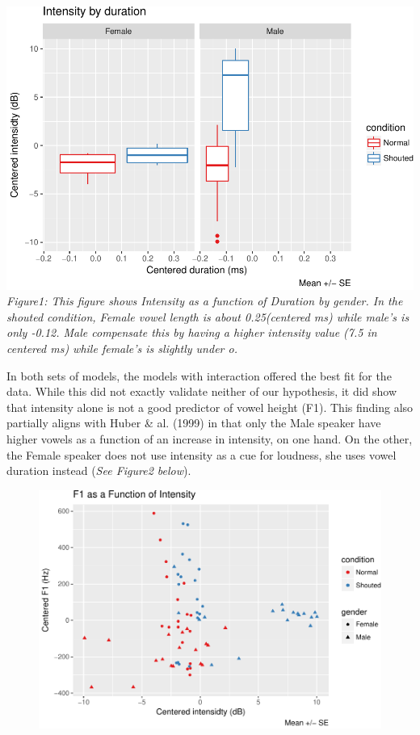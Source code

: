 \documentclass[floatsintext,man]{apa6}
\theoremstyle{definition}
\theoremstyle{definition}
\theoremstyle{definition}
\theoremstyle{remark}
\begin{document}
\includegraphics{shouted_files/figure-latex/Figure1-1.pdf}
\emph{Figure1: This figure shows Intensity as a function of Duration by
gender. In the shouted condition, Female vowel length is about
0.25(centered ms) while male's is only -0.12. Male compensate this by
having a higher intensity value (7.5 in centered ms) while female's is
slightly under o.}

In both sets of models, the models with interaction offered the best fit
for the data. While this did not exactly validate neither of our
hypothesis, it did show that intensity alone is not a good predictor of
vowel height (F1). This finding also partially aligns with Huber \& al.
(1999) in that only the Male speaker have higher vowels as a function of
an increase in intensity, on one hand. On the other, the Female speaker
does not use intensity as a cue for loudness, she uses vowel duration
instead (\emph{See Figure2 below}).

\newpage

\begin{figure}
\centering
\includegraphics{shouted_files/figure-latex/Figure4-1.pdf}
\caption{}
\end{figure}
\end{document}
